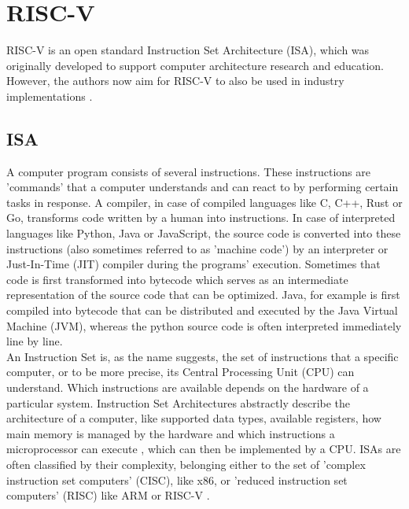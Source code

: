 

\section{RISC-V}

RISC-V \cite{riscv} is an open standard Instruction Set Architecture (ISA), which
was originally developed to support computer architecture research and education.
However, the authors now aim for RISC-V to also be used in industry implementations \cite{riscv_spec}.

\subsection{ISA}

A computer program consists of several instructions.
These instructions are 'commands' that a computer understands and can react to by performing certain tasks in response.
A compiler, in case of compiled languages like C, C++, Rust or Go, transforms code written by a human into instructions.
In case of interpreted languages like Python, Java or JavaScript, the source code is converted into these instructions
(also sometimes referred to as 'machine code') by an interpreter or Just-In-Time (JIT) compiler during the programs' execution.
Sometimes that code is first transformed into bytecode which serves as an intermediate representation of the source code
that can be optimized.
Java, for example is first compiled into bytecode that can be distributed and executed by the Java Virtual Machine (JVM),
whereas the python source code is often interpreted immediately line by line.
\\
An Instruction Set is, as the name suggests, the set of instructions that a specific computer, or to be more precise,
its Central Processing Unit (CPU) can understand.
Which instructions are available depends on the hardware of a particular system.
Instruction Set Architectures abstractly describe the architecture of a computer,
like supported data types, available registers, how main memory is managed by the hardware and
which instructions a microprocessor can execute \cite{isa}, which can then be implemented by a CPU.
ISAs are often classified by their complexity, belonging either to the set of 'complex instruction set computers' (CISC), like x86,
or 'reduced instruction set computers' (RISC) like ARM \cite{arm_architecture} or RISC-V \cite{riscv_spec}.

